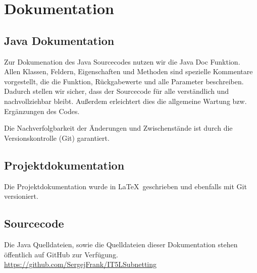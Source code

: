 \section{Dokumentation}

\subsection{Java Dokumentation}
Zur Dokumenation des Java Sourcecodes nutzen wir die Java Doc Funktion. Allen Klassen, Feldern,
Eigenschaften und Methoden sind spezielle Kommentare vorgestellt, die die Funktion, Rückgabewerte
und alle Parameter beschreiben. Dadurch stellen wir sicher, dass der Sourcecode für alle verständlich und
nachvollziehbar bleibt. Außerdem erleichtert dies die allgemeine Wartung bzw. Ergänzungen des Codes.

Die Nachverfolgbarkeit der Änderungen und Zwischenstände ist durch die Versionskontrolle (Git) garantiert.

\subsection{Projektdokumentation}
Die Projektdokumentation wurde in \LaTeX\  geschrieben und ebenfalls mit Git versioniert. 

\subsection{Sourcecode}
Die Java Quelldateien, sowie die Quelldateien dieser Dokumentation stehen öffentlich auf GitHub zur Verfügung.
\url{https://github.com/SergejFrank/IT5LSubnetting}
